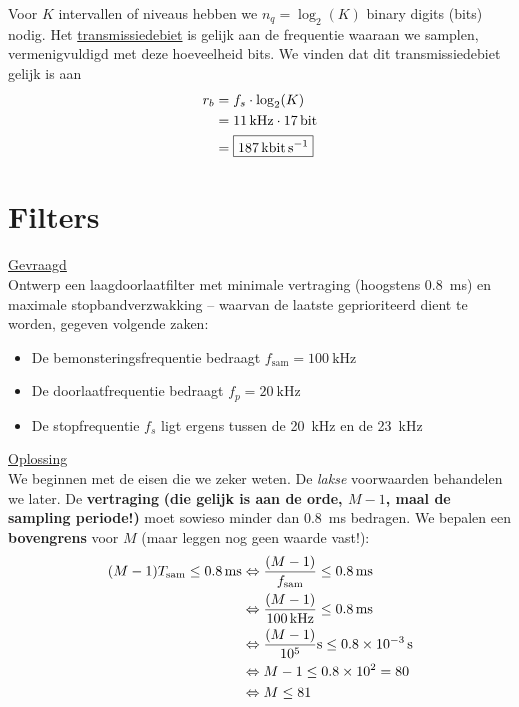 \documentclass{kuburgiearticle}
\newcommand{\sam}{\text{sam}}
\begin{document}
\begin{enumerate}
\begin{itemize}
			Voor \( K \) intervallen of niveaus hebben we \( n_q=\log_2(K) \) binary digits (bits) nodig. Het \underline{transmissiedebiet} is gelijk aan de frequentie waaraan we samplen, vermenigvuldigd met deze hoeveelheid bits. We vinden dat dit transmissiedebiet gelijk is aan \begin{align*}
				r_b &= f_s \cdot \log_2(K) \\
				&= \SI{11}{\kilo\hertz} \cdot \SI{17}{\bit} \\
				&= \boxed{\SI{187}{\kilo\bit\per\second}}
			\end{align*}

		\end{itemize}


	\end{enumerate}

	\newpage
	\section{Filters}


	\underline{Gevraagd} \\

	Ontwerp een laagdoorlaatfilter met minimale vertraging (hoogstens \SI{0.8}{\milli\second}) en maximale stopbandverzwakking -- waarvan de laatste geprioriteerd dient te worden, gegeven volgende zaken:

	\begin{itemize}
		\item De bemonsteringsfrequentie bedraagt \(f_{\text{sam}}=\SI{100}{\kilo\hertz}\)
		\item De doorlaatfrequentie bedraagt \(f_p=\SI{20}{\kilo\hertz}\)
		\item De stopfrequentie \(f_s\) ligt ergens tussen de \SI{20}{\kilo\hertz} en de \SI{23}{\kilo\hertz}
	\end{itemize}

	\underline{Oplossing}\\

	We beginnen met de eisen die we zeker weten. De \textit{lakse} voorwaarden behandelen we later. De \textbf{vertraging} \textbf{(die gelijk is aan de orde, \(M-1\), maal de sampling periode!)} moet sowieso minder dan \SI{0.8}{\milli\second} bedragen. We bepalen een \textbf{bovengrens} voor \(M\) (maar leggen nog geen waarde vast!):
	\begin{align*}
		(M-1) T_\sam \leq \SI{0.8}{\milli\second} &\Leftrightarrow \frac{(M-1)}{f_\sam}\leq \SI{0.8}{\milli\second} \\
		& \Leftrightarrow \frac{(M-1)}{\SI{100}{\kilo\hertz}}\leq \SI{0.8}{\milli\second} \\
		& \Leftrightarrow \frac{(M-1)}{10^5} \SI{}{\second}\leq \SI{0.8e{-3}}{\second} \\
		& \Leftrightarrow M-1 \leq \SI{0.8e2}{} = 80 \\
		& \Leftrightarrow M\leq81
	\end{align*}
\end{document}
